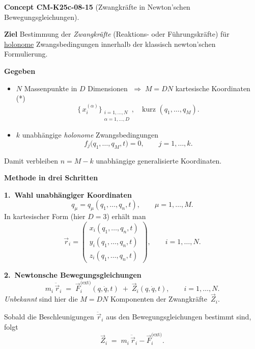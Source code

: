 \documentclass[10pt, letterpaper]{article}
\newcommand{\CustomHeading}[3]{%
  \par\medskip\noindent%
  \textbf{#1 #2} \textnormal{(#3)}.\enskip%
}
\newenvironment{CONC}[2]{\begin{unitbox}\CustomHeading{Concept}{#1}{#2}}{\end{unitbox}}
\begin{document}
\begin{CONC}{CM-K25c-08-15}{Zwangkräfte in Newton'schen Bewegungsgleichungen}
\textbf*{Ziel}
Bestimmung der \emph{Zwangkräfte} (Reaktions- oder Führungskräfte) 
für \underline{holonome} Zwangsbedingungen innerhalb der klassisch
newton’schen Formulierung.

\textbf*{Gegeben}
\begin{itemize}
  \item $N$ Massenpunkte in $D$ Dimensionen $\;\Longrightarrow\; M=DN$
        kartesische Koordinaten\,(*)  
        \[
          \bigl\{\,x_{i}^{(\alpha)}\bigr\}_{\substack{i=1,\dots,N\\\alpha=1,\dots,D}},
          \quad
          \text{kurz } 
          (q_1,\dots,q_M).
        \]
  \item $k$ unabhängige \emph{holonome} Zwangsbedingungen
        \[
          f_j\bigl(q_1,\dots,q_M,t\bigr)=0,
          \qquad j=1,\dots,k .
        \]
\end{itemize}
Damit verbleiben $n=M-k$ unabhängige generalisierte Koordinaten.

\textbf*{Methode in drei Schritten}

\textbf{1.\ Wahl unabhängiger Koordinaten}
\[
  q_\mu = q_\mu(q_1,\dots,q_n,t), 
  \qquad \mu = 1,\dots,M .
\]
In kartesischer Form (hier $D=3$) erhält man
\[
  \vec r_i = 
  \begin{pmatrix}
    x_i(q_1,\dots,q_n,t)\\[2pt]
    y_i(q_1,\dots,q_n,t)\\[2pt]
    z_i(q_1,\dots,q_n,t)
  \end{pmatrix},
  \qquad
  i=1,\dots,N .
\]

\textbf{2.\ Newtonsche Bewegungsgleichungen}
\[
  m_i\,\ddot{\vec r}_i
  \;=\;
  \vec F_i^{\text{(ext)}}(q,\dot q,t)
  \;+\;
  \vec Z_i(q,\dot q,t),
  \qquad i=1,\dots,N .
\]
\emph{Unbekannt} sind hier die $M=DN$ Komponenten der
Zwangkräfte~$\vec Z_i$.

Sobald die Beschleunigungen $\ddot{\vec r}_i$
aus den Bewegungsgleichungen bestimmt sind, folgt
\[
  \vec Z_i 
  \;=\;
  m_i\,\ddot{\vec r}_i - \vec F_i^{\text{(ext)}} .
\]


\end{CONC}
\end{document}
